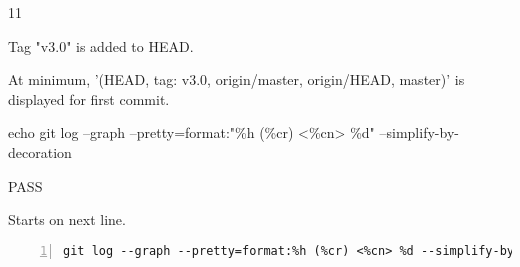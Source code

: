\begin{description}[align=right,leftmargin=3.2cm,labelindent=3.0cm]
\item[Step:] 11
\item[Confirm:] Tag "v3.0" is added to HEAD.
\item[Expectation:] At minimum, '(HEAD, tag: v3.0, origin/master, origin/HEAD, master)' is displayed for first commit.
\item[Command:] echo git  log --graph --pretty=format:"\%h (\%cr) <\%cn> \%d" --simplify-by-decoration
\item[Test Result:] PASS
\item[Evidence:] Starts on next line.
\end{description}
\begin{lstlisting}[numbers=left]
git log --graph --pretty=format:%h (%cr) <%cn> %d --simplify-by-decoration

\end{lstlisting}

